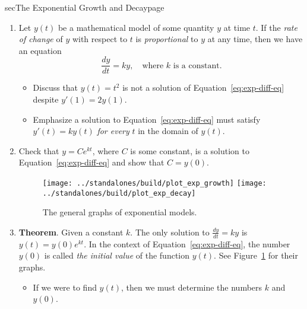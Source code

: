 \documentclass[../main]{subfiles}
\begin{document}
\begin{outline}{sec}{The Exponential Growth and Decay}{page} \label{outline:exp-model}
  \begin{enumerate}
    \item Let \(y(t)\) be a mathematical model of some quantity \(y\) at time \(t\). If the \emph{rate of change} of \(y\) with respect to \(t\) is \emph{proportional} to \(y\) at any time, then we have an equation
      \begin{equation} \label{eq:exp-diff-eq} 
        \frac{dy}{dt} = ky, \quad\text{where } k \text{ is a constant.}
      \end{equation} 

      \begin{itemize}
        \item Discuss that \(y(t) = t^{2}\) is not a solution of Equation~\eqref{eq:exp-diff-eq} despite \(y'(1) = 2 y(1)\).
        \item Emphasize a solution to Equation~\eqref{eq:exp-diff-eq} must satisfy \(y'(t) = ky(t)\) \emph{for every} \(t\) in the domain of \(y(t)\).
      \end{itemize}

    \item Check that \(y = C e^{kt}\), where \(C\) is some constant, is a solution to Equation~\eqref{eq:exp-diff-eq} and show that \(C = y(0)\).
      \begin{figure}[ht]
        \centering
        \texttt{[image: ../standalones/build/plot\_exp\_growth]}
        \quad
        \texttt{[image: ../standalones/build/plot\_exp\_decay]}
        \label{fig:exp-models}
        \caption{The general graphs of exponential models.}
      \end{figure}

    \item \textbf{Theorem}. Given a constant \(k\). The only solution to \(\frac{dy}{dt} = ky\) is \(y(t) = y(0) e^{kt}\). In the context of Equation~\eqref{eq:exp-diff-eq}, the number \(y(0)\) is called \emph{the initial value} of the function \(y(t)\).  See Figure~\ref{fig:exp-models} for their graphs.
      \begin{itemize}
        \item If we were to find \(y(t)\), then we must determine the numbers \(k\) and \(y(0)\).
      \end{itemize}
      

\end{enumerate}
\end{outline}
\end{document}

